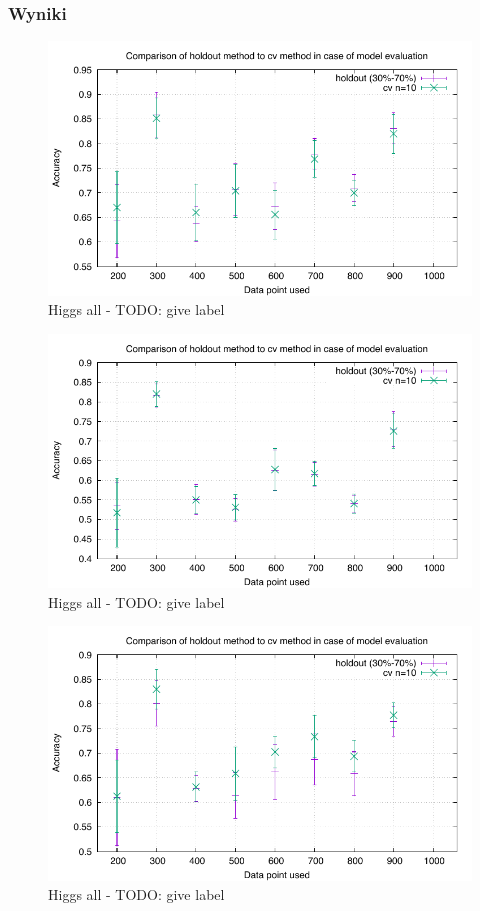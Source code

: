 \subsubsection{Wyniki}
\newcommand{\cvsize}{1}


\begin{figure}
\centering
\includegraphics[scale=\cvsize]{res/cv_ann.pdf}
\caption[Caption for LOF]{Higgs all - TODO: give label\label{higgsall}}
\end{figure}

\begin{figure}
\centering
\includegraphics[scale=\cvsize]{res/cv_svm.pdf}
\caption[Caption for LOF]{Higgs all - TODO: give label\label{higgsall}}
\end{figure}

\begin{figure}
\centering
\includegraphics[scale=\cvsize]{res/cv_forest.pdf}
\caption[Caption for LOF]{Higgs all - TODO: give label\label{higgsall}}
\end{figure}

